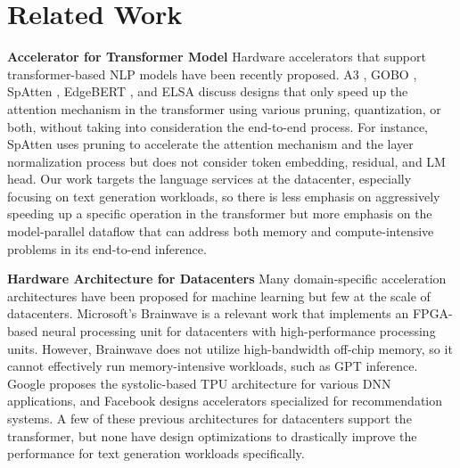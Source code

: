 

\section{Related Work}
\label{related_work}


\textbf{Accelerator for Transformer Model}
Hardware accelerators that support transformer-based NLP models have been recently proposed. A3 \cite{ham2020a3}, GOBO \cite{zadeh2020gobo}, SpAtten \cite{wang2021spatten}, EdgeBERT \cite{tambe2021edgebert}, and ELSA \cite{ham2021elsa} discuss designs that only speed up the attention mechanism in the transformer using various pruning, quantization, or both, without taking into consideration the end-to-end process. For instance, SpAtten uses pruning to accelerate the attention mechanism and the layer normalization process but does not consider token embedding, residual, and LM head. Our work targets the language services at the datacenter, especially focusing on text generation workloads, so there is less emphasis on aggressively speeding up a specific operation in the transformer but more emphasis on the model-parallel dataflow that can address both memory and compute-intensive problems in its end-to-end inference.

\textbf{Hardware Architecture for Datacenters} Many domain-specific acceleration architectures have been proposed for machine learning but few at the scale of datacenters. Microsoft's Brainwave \cite{fowers2018configurable} is a relevant work that implements an FPGA-based neural processing unit for datacenters with high-performance processing units. However, Brainwave does not utilize high-bandwidth off-chip memory, so it cannot effectively run memory-intensive workloads, such as GPT inference. Google \cite{jouppi2017datacenter, jouppi2020domain, jouppi2021ten} proposes the systolic-based TPU architecture for various DNN applications, and Facebook \cite{anderson2021first} designs accelerators specialized for recommendation systems. A few of these previous architectures for datacenters \cite{fowers2018configurable, jouppi2021ten} support the transformer, but none have design optimizations to drastically improve the performance for text generation workloads specifically.

